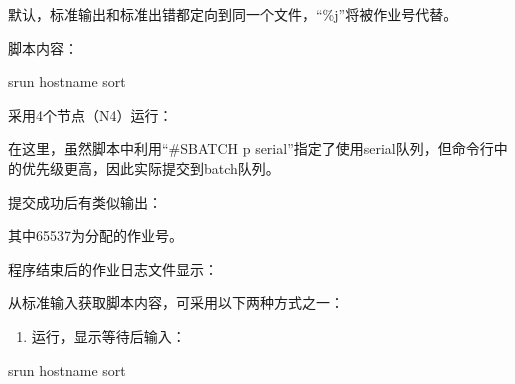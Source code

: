 \documentclass[a4paper,12pt,english]{sphinxmanual}
\begin{document}
\sphinxAtStartPar
默认，标准输出和标准出错都定向到同一个文件，“\%j”将被作业号代替。

\sphinxAtStartPar
脚本内容：

\begin{sphinxVerbatim}[commandchars=\\\{\}]
srun hostname sort
\end{sphinxVerbatim}

\sphinxAtStartPar
采用4个节点（\sphinxhyphen{}N4）运行：

\sphinxAtStartPar
在这里，虽然脚本中利用“\#SBATCH \sphinxhyphen{}p serial”指定了使用serial队列，但命令行中的优先级更高，因此实际提交到batch队列。

\sphinxAtStartPar
提交成功后有类似输出：

\begin{sphinxVerbatim}[commandchars=\\\{\}]
    
\end{sphinxVerbatim}

\sphinxAtStartPar
其中65537为分配的作业号。

\sphinxAtStartPar
程序结束后的作业日志文件显示：

\begin{sphinxVerbatim}[commandchars=\\\{\}]
\end{sphinxVerbatim}

\sphinxAtStartPar
从标准输入获取脚本内容，可采用以下两种方式之一：
\begin{enumerate}
%
\item {} 
\sphinxAtStartPar
运行，显示等待后输入：

\end{enumerate}

\begin{sphinxVerbatim}[commandchars=\\\{\}]
srun hostname sort
\end{sphinxVerbatim}
\end{document}
